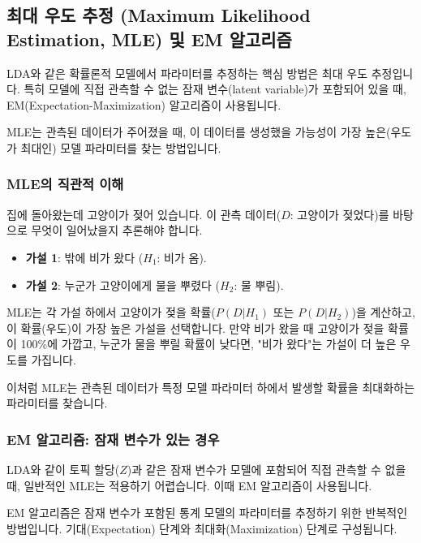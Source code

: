\documentclass[11pt,a4paper]{article}
\theoremstyle{definition}
\begin{document}
\newpage
\subsection{최대 우도 추정 (Maximum Likelihood Estimation, MLE) 및 EM 알고리즘}
LDA와 같은 확률론적 모델에서 파라미터를 추정하는 핵심 방법은 최대 우도 추정입니다. 특히 모델에 직접 관측할 수 없는 잠재 변수(latent variable)가 포함되어 있을 때, EM(Expectation-Maximization) 알고리즘이 사용됩니다.

\begin{tcolorbox}[definition={최대 우도 추정 (MLE)}]
MLE는 관측된 데이터가 주어졌을 때, 이 데이터를 생성했을 가능성이 가장 높은(우도가 최대인) 모델 파라미터를 찾는 방법입니다.
\end{tcolorbox}

\subsubsection{MLE의 직관적 이해}
\begin{tcolorbox}[example={젖은 고양이 비유}]
집에 돌아왔는데 고양이가 젖어 있습니다. 이 관측 데이터($D$: 고양이가 젖었다)를 바탕으로 무엇이 일어났을지 추론해야 합니다.
\begin{itemize}
    \item \textbf{가설 1}: 밖에 비가 왔다 ($H_1$: 비가 옴).
    \item \textbf{가설 2}: 누군가 고양이에게 물을 뿌렸다 ($H_2$: 물 뿌림).
\end{itemize}
MLE는 각 가설 하에서 고양이가 젖을 확률($P(D|H_1)$ 또는 $P(D|H_2)$)을 계산하고, 이 확률(우도)이 가장 높은 가설을 선택합니다. 만약 비가 왔을 때 고양이가 젖을 확률이 100\%에 가깝고, 누군가 물을 뿌릴 확률이 낮다면, "비가 왔다"는 가설이 더 높은 우도를 가집니다.
\end{tcolorbox}
이처럼 MLE는 관측된 데이터가 특정 모델 파라미터 하에서 발생할 확률을 최대화하는 파라미터를 찾습니다.

\subsubsection{EM 알고리즘: 잠재 변수가 있는 경우}
LDA와 같이 토픽 할당($Z$)과 같은 잠재 변수가 모델에 포함되어 직접 관측할 수 없을 때, 일반적인 MLE는 적용하기 어렵습니다. 이때 EM 알고리즘이 사용됩니다.

\begin{tcolorbox}[definition={EM 알고리즘}]
EM 알고리즘은 잠재 변수가 포함된 통계 모델의 파라미터를 추정하기 위한 반복적인 방법입니다. 기대(Expectation) 단계와 최대화(Maximization) 단계로 구성됩니다.
\end{tcolorbox}
\end{document}
